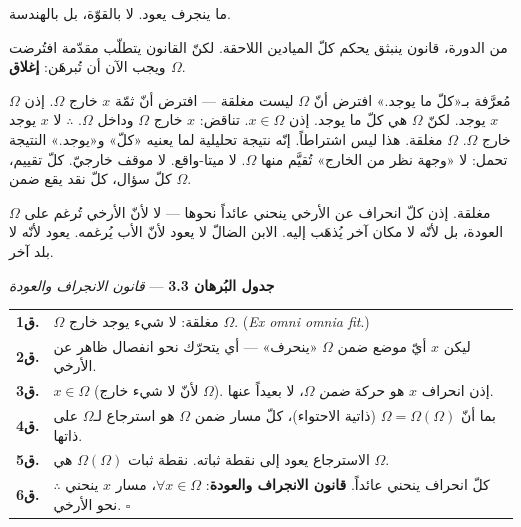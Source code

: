 \documentclass[10pt, openany, oneside]{book}
\renewcommand{\footnotesize}{\fontsize{8.5}{11}\selectfont}
\begin{document}
\vspace{1em}

\noindent ما ينجرف يعود. لا بالقوّة، بل بالهندسة.

من الدورة، قانون ينبثق يحكم كلّ الميادين اللاحقة. لكنّ القانون يتطلّب مقدّمة افتُرضت ويجب الآن أن تُبرهَن: \textbf{إغلاق $\Omega$}.

$\Omega$ مُعرَّفة بـ«كلّ ما يوجد.» افترض أنّ $\Omega$ ليست مغلقة --- افترض أنّ ثمّة $x$ خارج $\Omega$. إذن $x$ يوجد. لكنّ $\Omega$ هي كلّ ما يوجد. إذن $x \in \Omega$. تناقض: $x$ خارج $\Omega$ وداخل $\Omega$. $\therefore$ لا $x$ يوجد خارج $\Omega$. $\Omega$ مغلقة. هذا ليس اشتراطاً. إنّه نتيجة تحليلية لما يعنيه «كلّ» و«يوجد.» النتيجة تحمل: لا «وجهة نظر من الخارج» تُقيَّم منها $\Omega$. لا ميتا-واقع. لا موقف خارجيّ. كلّ تقييم، كلّ سؤال، كلّ نقد يقع ضمن $\Omega$.

$\Omega$ مغلقة. إذن كلّ انحراف عن الأرخي ينحني عائداً نحوها --- لا لأنّ الأرخي تُرغم على العودة، بل لأنّه لا مكان آخر يُذهَب إليه. الابن الضالّ لا يعود لأنّ الأب يُرغمه. يعود لأنّه لا بلد آخر.

\vspace{0.5em}

\textbf{جدول البُرهان 3.3} --- \textit{قانون الانجراف والعودة}

\vspace{0.5em}

{\footnotesize
\noindent\begin{tabular}{r p{}}
\textbf{ق1.} & $\Omega$ مغلقة: لا شيء يوجد خارج $\Omega$. (\textit{Ex omni omnia fit}.) \\[0.3em]
\textbf{ق2.} & ليكن $x$ أيّ موضع ضمن $\Omega$ «ينحرف» --- أي يتحرّك نحو انفصال ظاهر عن الأرخي. \\[0.3em]
\textbf{ق3.} & $x \in \Omega$ (لأنّ لا شيء خارج $\Omega$). إذن انحراف $x$ هو حركة \textit{ضمن} $\Omega$، لا بعيداً عنها. \\[0.3em]
\textbf{ق4.} & بما أنّ $\Omega = \Omega(\Omega)$ (ذاتية الاحتواء)، كلّ مسار ضمن $\Omega$ هو استرجاع لـ$\Omega$ على ذاتها. \\[0.3em]
\textbf{ق5.} & الاسترجاع يعود إلى نقطة ثباته. نقطة ثبات $\Omega(\Omega)$ هي $\Omega$. \\[0.3em]
\textbf{ق6.} & $\therefore$ كلّ انحراف ينحني عائداً. \textbf{قانون الانجراف والعودة}: $\forall x \in \Omega$، مسار $x$ ينحني نحو الأرخي. $\square$ \\[0.3em]
\end{tabular}
}

\vspace{0.8em}
\end{document}
